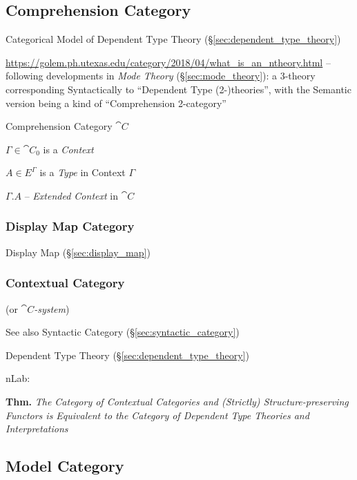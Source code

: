 \subsection{Comprehension Category}\label{sec:comprehension_category}

Categorical Model of Dependent Type Theory (\S\ref{sec:dependent_type_theory})

\url{https://golem.ph.utexas.edu/category/2018/04/what_is_an_ntheory.html} --
following developments in \emph{Mode Theory} (\S\ref{sec:mode_theory}): a
$3$-theory corresponding Syntactically to ``Dependent Type (2-)theories'', with
the Semantic version being a kind of ``Comprehension 2-category''

Comprehension Category $\cat{C}$

$\Gamma \in \cat{C}_0$ is a \emph{Context}

$A \in E^\Gamma$ is a \emph{Type} in Context $\Gamma$

$\Gamma.A$ -- \emph{Extended Context} in $\cat{C}$



\subsubsection{Display Map Category}\label{sec:display_map_category}

Display Map (\S\ref{sec:display_map})



\subsubsection{Contextual Category}\label{sec:contextual_category}

(or \emph{$\cat{C}$-system})

\fist See also Syntactic Category (\S\ref{sec:syntactic_category})

Dependent Type Theory (\S\ref{sec:dependent_type_theory})

nLab:

\textbf{Thm.} \emph{The Category of Contextual Categories and
  (Strictly) Structure-preserving Functors is Equivalent to the
  Category of Dependent Type Theories and Interpretations} %



\subsection{Model Category}\label{sec:model_category}


